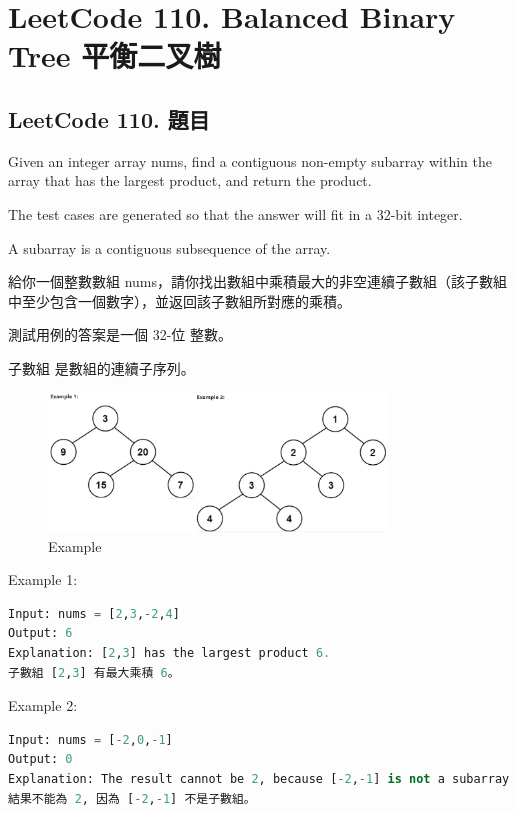 \documentclass[10pt,UTF8]{ctexart}
\begin{document}
\newpage

\section{LeetCode 110. Balanced Binary Tree 平衡二叉樹}

\subsection{LeetCode 110. 題目}

Given an integer array nums, find a contiguous non-empty subarray within the array that has the largest product, and return the product.

The test cases are generated so that the answer will fit in a 32-bit integer.

A subarray is a contiguous subsequence of the array.

給你一個整數數組 nums，請你找出數組中乘積最大的非空連續子數組（該子數組中至少包含一個數字），並返回該子數組所對應的乘積。

測試用例的答案是一個 32-位 整數。

子數組 是數組的連續子序列。

\begin{figure}[H]
\centering 
\includegraphics[width=0.80\textwidth]{lc-110-p-example.png} 
\caption{Example}
\label{Test}
\end{figure}


Example 1:

\begin{lstlisting}[language={python}]
Input: nums = [2,3,-2,4]
Output: 6
Explanation: [2,3] has the largest product 6.
子數組 [2,3] 有最大乘積 6。
\end{lstlisting}

Example 2:

\begin{lstlisting}[language={python}]
Input: nums = [-2,0,-1]
Output: 0
Explanation: The result cannot be 2, because [-2,-1] is not a subarray.
結果不能為 2, 因為 [-2,-1] 不是子數組。
\end{lstlisting}
\end{document}
